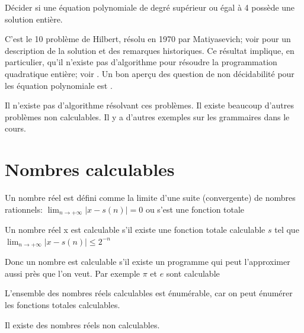 \begin{mydef}
  Décider si une équation
  polynomiale de degré supérieur ou égal à 4 possède une solution entière.
\end{mydef}
C'est le 10\ieme{} problème de Hilbert, résolu en 1970 par Matiyasevich;
voir \cite{davis1973hilbert} pour un description de la solution et des remarques historiques.
Ce résultat implique, en particulier, qu'il n'existe pas d'algorithme pour résoudre
la programmation quadratique entière; voir \cite{jeroslow1973there}.
Un bon aperçu des question de non décidabilité pour les équation polynomiale est \cite{koenigsmann2014undecidability}.

Il n'existe pas d'algorithme résolvant ces problèmes. Il existe beaucoup
d'autres problèmes non calculables. Il y a d'autres exemples sur les grammaires dans le cours.

\section{Nombres calculables}
\label{sub:nombres_calculables}

\begin{mydef}
	Un nombre réel est défini comme la limite d'une suite (convergente) de
	nombres rationnels: $\lim_{n \rightarrow +\infty} |x-s(n)| = 0 $ ou s’est
	une fonction totale
\end{mydef}

\begin{mydef}
	Un nombre réel x est calculable s’il existe une fonction totale
	calculable $s$ tel que $\lim_{n \rightarrow +\infty} |x-s(n)| \leq 2^{-n}$
\end{mydef}

\begin{myrem}
	Donc un nombre est calculable s'il existe un programme qui peut
	l'approximer aussi près que l'on veut. Par exemple $\pi$ et $e$ sont
	calculable
\end{myrem}

\begin{myprop}
	L'ensemble des nombres réels calculables est énumérable, car on peut énumérer les
	fonctions totales calculables.
\end{myprop}

\begin{myprop}
	Il existe des nombres réels non calculables.
\end{myprop}

